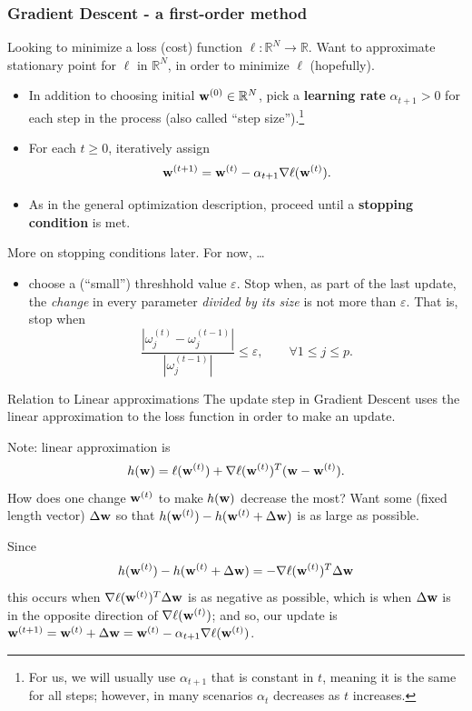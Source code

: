 \documentclass{beamer}
\theoremstyle{example}
\begin{document}
\begin{frame}
\frametitle{Gradient Descent - a first-order method}
    Looking to minimize a loss (cost) function $\ell:\mathbb R^N \to \mathbb R$. Want to approximate stationary point for $\ell$ in $\mathbb R^N$, in order to minimize $\ell$ (hopefully). 

    \pause
    \begin{itemize}
        \item In addition to choosing initial ${\bf w}^{(0)}\in \mathbb R^N$, pick a \textbf{learning rate} $\alpha_{t+1} > 0$ for each step in the process (also called ``step size'').\footnote{For us, we will usually use $\alpha_{t+1}$ that is constant in $t$, meaning it is the same for all steps; however, in many scenarios $\alpha_t$ decreases as $t$ increases.} 
        \pause
        \item For each $t\ge 0$, iteratively assign
        \[{\bf w}^{(t+1)} = {\bf w}^{(t)} - \alpha_{t+1}\nabla\ell({\bf w}^{(t)}).\]
        \pause
        \item As in the general optimization description, proceed until a \textbf{stopping condition} is met.
    \end{itemize}

    \pause
    More on stopping conditions later. For now, \ldots 
    \pause
    \begin{itemize}
        \item choose a (``small'') threshhold value $\varepsilon$. Stop when, as part of the last update, the \emph{change} in every parameter \emph{divided by its size} is not more than $\varepsilon$. \pause That is, stop when 
        {\small
        \[\frac{|\omega^{(t)}_j - \omega^{(t-1)}_j|}{|\omega^{(t-1)}_j|} \le \varepsilon,\qquad \forall 1\le j\le p.\]
        }
    \end{itemize}
\end{frame}
\begin{frame}{Relation to Linear approximations}
    The update step in Gradient Descent uses the linear approximation to the loss function in order to make an update.

    \pause 
    Note: linear approximation is 
    \[h({\bf w}) = \ell({\bf w}^{(t)}) + \nabla\ell({\bf w}^{(t)})^T({\bf w} - {\bf w}^{(t)}).\]
    How does one change ${\bf w}^{(t)}$ to make $h({\bf w})$ decrease the most? Want some (fixed length vector) $\Delta{\bf w}$ so that $h({\bf w}^{(t)}) - h({\bf w}^{(t)}+\Delta{\bf w})$ is as large as possible.

    \pause
    Since \[h({\bf w}^{(t)}) - h({\bf w}^{(t)}+\Delta{\bf w}) = -\nabla\ell({\bf w}^{(t)})^T\Delta{\bf w}\]
    this occurs when $\nabla\ell({\bf w}^{(t)})^T\Delta{\bf w}$ is as negative as possible, which is when $\Delta{\bf w}$ is in the opposite direction of $\nabla\ell({\bf w}^{(t)})$; and so, our update is ${\bf w}^{(t+1)} = {\bf w}^{(t)}+\Delta{\bf w} = {\bf w}^{(t)}-\alpha_{t+1}\nabla\ell({\bf w}^{(t)})$.
\end{frame}
\end{document}
